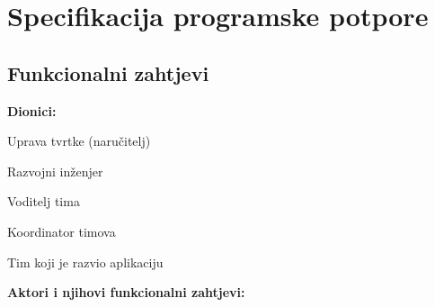 \chapter{Specifikacija programske potpore}
		
	\section{Funkcionalni zahtjevi}
			
			
			\noindent \textbf{Dionici:}
			
			\begin{packed_enum}
				
				\item Uprava tvrtke (naručitelj)
				\item Razvojni inženjer				
				\item Voditelj tima
				\item Koordinator timova
				\item Tim koji je razvio aplikaciju
				
			\end{packed_enum}
			
			\noindent \textbf{Aktori i njihovi funkcionalni zahtjevi:}
			

